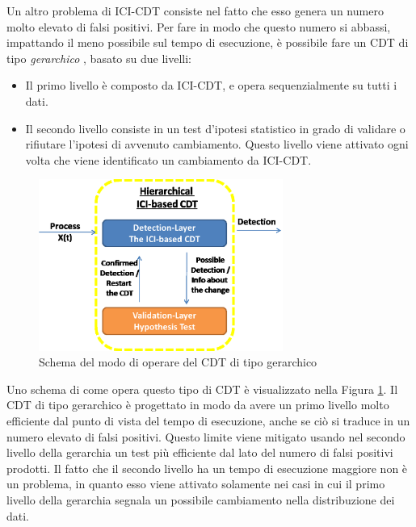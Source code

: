 Un altro problema di ICI-CDT consiste nel fatto che esso genera un numero molto elevato di falsi positivi. Per fare in modo che questo numero si abbassi, impattando il meno possibile sul tempo di esecuzione, \`e possibile fare un CDT di tipo \textit{gerarchico} \cite{alippi2011hierarchical}, basato su due livelli:
\begin{itemize}
	\item Il primo livello \`e composto da ICI-CDT, e opera sequenzialmente su tutti i dati.
	\item Il secondo livello consiste in un test d'ipotesi statistico in grado di validare o rifiutare l'ipotesi di avvenuto cambiamento. Questo livello viene attivato ogni volta che viene identificato un cambiamento da ICI-CDT.
\end{itemize}
\begin{figure}
	\centering
	\includegraphics[width=8cm,keepaspectratio]{pictures/Hierarchical_ICI_based_CDT_Scheme}
	\caption{Schema del modo di operare del CDT di tipo gerarchico}
	\label{fig:HierarchicalCDT}
\end{figure}
Uno schema di come opera questo tipo di CDT \`e visualizzato nella Figura \ref{fig:HierarchicalCDT}.
Il CDT di tipo gerarchico \`e progettato in modo da avere un primo livello molto efficiente dal punto di vista del tempo di esecuzione, anche se ci\`o si traduce in un numero elevato di falsi positivi. Questo limite viene mitigato usando nel secondo livello della gerarchia un test pi\`u efficiente dal lato del numero di falsi positivi prodotti. Il fatto che il secondo livello ha un tempo di esecuzione maggiore non \`e un problema, in quanto esso viene attivato solamente nei casi in cui il primo livello della gerarchia segnala un possibile cambiamento nella distribuzione dei dati.
